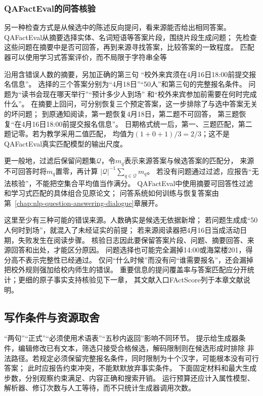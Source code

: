 \subsubsection{QAFactEval的问答核验}
\label{sec:nlp-generation-qafacteval}

另一种检查方式是从候选中的陈述反向提问，看来源能否给出相同答案。
QAFactEval从摘要选择实体、名词短语等答案片段，围绕片段生成问题；
先检查这些问题在摘要中是否可回答，再到来源寻找答案，比较答案的一致程度。
匹配器可以使用学习式答案评价，而不局限于字符串全等

沿用含错误人数的摘要，另加正确的第三句
“校外来宾须在4月16日18:00前提交报名信息”。
选择的三个答案分别为“4月18日”“50人”和第三句的完整报名条件。
问题为“读书会现在哪天举行”“预计多少人到场”
和“校外来宾参加前需要在何时完成什么”。
在摘要上回问，可分别恢复三个预定答案，这一步排除了与选中答案无关的坏问题；
到原通知阅读，第一题恢复4月18日，第二题不可回答，
第三题恢复“在4月16日18:00前提交报名信息”。
日期格式统一后，第一、三题匹配，第二题记零。若为教学采用二值匹配，
均值为$(1+0+1)/3=2/3$；这不是QAFactEval真实匹配模型的输出尺度。

更一般地，过滤后保留问题集$\mathcal{Q}$，令$m_q$表示来源答案与候选答案的匹配分，
来源不可回答时将$m_q$置零，再计算
$|\mathcal{Q}|^{-1}\sum_{q\in\mathcal{Q}}m_q$。
若没有问题通过过滤，应报告“无法核验”，不能把空集合平均值当作满分。
QAFactEval中使用摘要可回答性过滤和学习式匹配的具体组合见原论文；
问答系统如何训练与恢复答案由第~\ref{chap:nlp-question-answering-dialogue}章展开。

这里至少有三种可能的错误来源。人数确实是候选无依据新增；
若问题生成成“50人何时到场”，就混入了未经证实的前提；
若来源阅读器把4月16日当成活动日期，失败发生在阅读步骤。
核验日志因此要保留答案片段、问题、摘要回答、来源回答和出处，才能区分原因。
问题选择也可能完全漏掉14:00或海棠楼201，得分高不表示完整性已经通过。
仅问“什么时候”而没有问“谁需要报名”，还会漏掉把校外规则强加给校内师生的错误。
重要信息的提问覆盖率与答案匹配应分开统计；更细的原子事实支持核验见下一章，
其文献入口FActScore列于本章文献说明。

\subsection{写作条件与资源取舍}
\label{sec:nlp-generation-constraints}

“两句”“正式”“必须使用术语表”“五秒内返回”影响不同环节。
提示给生成器条件，编辑修改已有文本，筛选只接受合格候选，解码限制则在候选形成时排除
非法路径。若规定必须保留完整报名条件，同时限制为十个汉字，可能根本没有可行答案；
此时应报告约束冲突，不能默默放弃事实条件。
下面固定材料和最大生成步数，分别观察约束满足、内容正确和搜索开销。
运行预算还应计入属性模型、解析器、修订次数与人工等待，而不只统计生成器调用次数。

